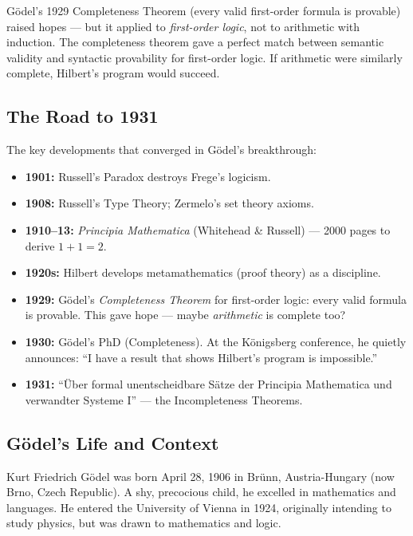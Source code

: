 Gödel's 1929 Completeness Theorem (every valid first-order formula is provable) raised hopes --- but it applied to \emph{first-order logic}, not to arithmetic with induction. The completeness theorem gave a perfect match between semantic validity and syntactic provability for first-order logic. If arithmetic were similarly complete, Hilbert's program would succeed.

\subsection{The Road to 1931}
\label{sec:godel:road}

The key developments that converged in Gödel's breakthrough:

\begin{itemize}
\item \textbf{1901:} Russell's Paradox destroys Frege's logicism.
\item \textbf{1908:} Russell's Type Theory; Zermelo's set theory axioms.
\item \textbf{1910--13:} \emph{Principia Mathematica} (Whitehead \& Russell) --- 2000 pages to derive $1+1=2$.
\item \textbf{1920s:} Hilbert develops metamathematics (proof theory) as a discipline.
\item \textbf{1929:} Gödel's \emph{Completeness Theorem} for first-order logic: every valid formula is provable. This gave hope --- maybe \emph{arithmetic} is complete too?
\item \textbf{1930:} Gödel's PhD (Completeness). At the Königsberg conference, he quietly announces: ``I have a result that shows Hilbert's program is impossible.''
\item \textbf{1931:} ``Über formal unentscheidbare Sätze der Principia Mathematica und verwandter Systeme I'' --- the Incompleteness Theorems.
\end{itemize}

\subsection{Gödel's Life and Context}
\label{sec:godel:life}

Kurt Friedrich Gödel was born April 28, 1906 in Brünn, Austria-Hungary (now Brno, Czech Republic). A shy, precocious child, he excelled in mathematics and languages. He entered the University of Vienna in 1924, originally intending to study physics, but was drawn to mathematics and logic.

